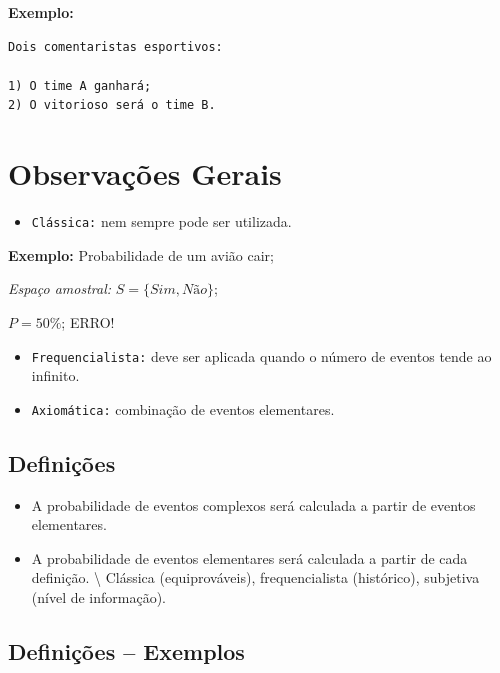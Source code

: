 \documentclass[
]{book}
\providecommand{\tightlist}{%
  \setlength{\itemsep}{0pt}\setlength{\parskip}{0pt}}
\begin{document}
\textbf{Exemplo:}

\begin{verbatim}
Dois comentaristas esportivos: 

1) O time A ganhará;
2) O vitorioso será o time B. 
\end{verbatim}

\hypertarget{observauxe7uxf5es-gerais}{%
\section{Observações Gerais}\label{observauxe7uxf5es-gerais}}

\begin{itemize}
\tightlist
\item
  \texttt{Clássica:} nem sempre pode ser utilizada.
\end{itemize}

\textbf{Exemplo:} Probabilidade de um avião cair;

\emph{Espaço amostral:} \(S=\{Sim, Não\}\);

\(P=50\%\); ERRO!

\begin{itemize}
\item
  \texttt{Frequencialista:} deve ser aplicada quando o número de eventos tende ao infinito.
\item
  \texttt{Axiomática:} combinação de eventos elementares.
\end{itemize}

\hypertarget{definiuxe7uxf5es-1}{%
\subsection{Definições}\label{definiuxe7uxf5es-1}}

\begin{itemize}
\tightlist
\item
  A probabilidade de eventos complexos será calculada a partir de eventos elementares.
\item
  A probabilidade de eventos elementares será calculada a partir de cada definição. \textbackslash{}
  Clássica (equiprováveis), frequencialista (histórico), subjetiva (nível de informação).
\end{itemize}

\hypertarget{definiuxe7uxf5es-exemplos}{%
\subsection{Definições -- Exemplos}\label{definiuxe7uxf5es-exemplos}}
\end{document}
